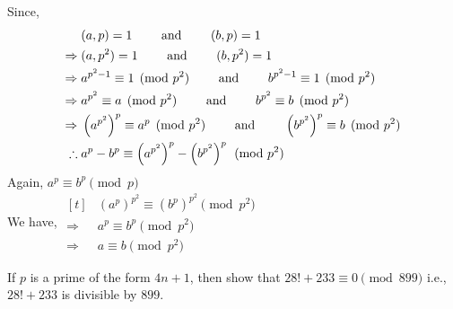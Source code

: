 \documentclass[12pt]{book}
\begin{document}
\begin{soln}
    Since,
    \begin{align}
        &(a,p)=1\qquad \text{ and }\qquad (b,p)=1\notag\\
        \Rightarrow\;&(a,p^2)=1\qquad \text{ and }\qquad (b,p^2)=1\notag\\
        \Rightarrow\;&a^{p^2-1}\equiv 1\pmod{p^2}\qquad \text{ and }\qquad b^{p^2-1}\equiv1\pmod{p^2}\notag\\
        \Rightarrow\;&a^{p^2}\equiv a\pmod{p^2}\qquad \text{ and }\qquad {b}^{p^2}\equiv b\pmod{p^2}\notag\\
        \Rightarrow\;&\left(a^{p^2}\right)^p\equiv a^p \pmod{p^2}\qquad \text{ and }\qquad \left({b}^{p^2}\right)^p\equiv b\pmod{p^2}\notag\\
        \therefore\;&a^{p}-b^p\equiv \left(a^{p^2}\right)^p-\left(b^{p^2}\right)^p \pmod{p^2}\notag
    \end{align}
    Again, $ a^p\equiv b^p\pmod{p} $\\
    We have, $ \begin{aligned}[t]
        &\left(a^{p}\right)^{p^2}\equiv \left(b^{p}\right)^{p^2} \pmod{p^2}\\
        \Rightarrow\; &a^{p} \equiv b^{p}\pmod{p^2}\\
        \Rightarrow\; &a \equiv b\pmod{p^2}
    \end{aligned} $
\end{soln}
\newpage
\begin{qn}
    If $ p $ is a prime of the form $ 4n+1 $, then show that $ 28!+233\equiv 0\pmod{899} $ i.e., $ 28!+233 $ is divisible by $ 899 $.
\end{qn}
\end{document}
